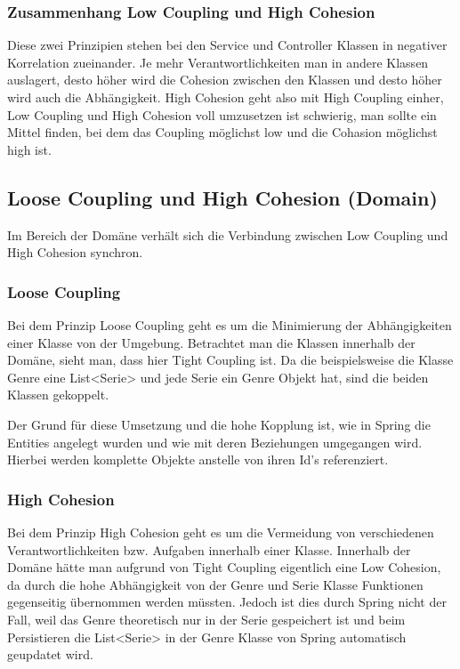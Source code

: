 		\subsubsection{Zusammenhang Low Coupling und High Cohesion}
		Diese zwei Prinzipien stehen bei den Service und Controller Klassen in negativer Korrelation zueinander. Je mehr Verantwortlichkeiten man in andere Klassen auslagert, desto höher wird die Cohesion zwischen den Klassen und desto höher wird auch die Abhängigkeit. High Cohesion geht also mit High Coupling einher, Low Coupling und High Cohesion voll umzusetzen ist schwierig, man sollte ein Mittel finden, bei dem das Coupling möglichst low und die Cohasion möglichst high ist.
	
	\subsection{Loose Coupling und High Cohesion (Domain)}
	Im Bereich der Domäne verhält sich die Verbindung zwischen Low Coupling und High Cohesion synchron.
	
		\subsubsection{Loose Coupling}
		
		Bei dem Prinzip Loose Coupling geht es um die Minimierung der Abhängigkeiten einer Klasse von der Umgebung. Betrachtet man die Klassen innerhalb der Domäne, sieht man, dass hier Tight Coupling ist. Da die beispielsweise die Klasse Genre eine List<Serie> und jede Serie ein Genre Objekt hat, sind die beiden Klassen gekoppelt. 
		
		Der Grund für diese Umsetzung und die hohe Kopplung ist, wie in Spring die Entities angelegt wurden und wie mit deren Beziehungen umgegangen wird. Hierbei werden komplette Objekte anstelle von ihren Id's referenziert.
		
		\subsubsection{High Cohesion}
		
		Bei dem Prinzip High Cohesion geht es um die Vermeidung von verschiedenen Verantwortlichkeiten bzw. Aufgaben innerhalb einer Klasse. Innerhalb der Domäne hätte man aufgrund von Tight Coupling eigentlich eine Low Cohesion, da durch die hohe Abhängigkeit von der Genre und Serie Klasse Funktionen gegenseitig übernommen werden müssten. Jedoch ist dies durch Spring nicht der Fall, weil das Genre theoretisch nur in der Serie gespeichert ist und beim Persistieren die List<Serie> in der Genre Klasse von Spring automatisch geupdatet wird.
		
